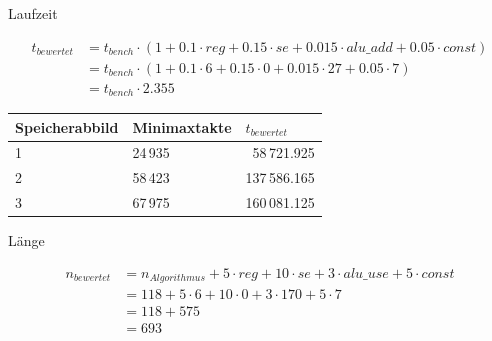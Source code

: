 \documentclass{beamer}
\begin{document}
\begin{frame}{Laufzeit}

{\footnotesize\begin{align*}
    t_{bewertet} &= t_{bench} \cdot (1 + 0.1 \cdot reg + 0.15 \cdot se + 0.015 \cdot alu\_add + 0.05 \cdot const) \\
                 &= t_{bench} \cdot (1 + 0.1 \cdot 6 + 0.15 \cdot 0 + 0.015 \cdot 27 + 0.05 \cdot 7) \\
                 &= t_{bench} \cdot 2.355
\end{align*}}

\begin{center}
    \begin{tabular}{|l|l|r|}
        \hline
        Speicherabbild & Minimaxtakte & \multicolumn{1}{l|}{$t_{bewertet}$} \\
        \hline
        \hline
        1 & 24\,935 & 58\,721.925 \\
        \hline
        2 & 58\,423 & 137\,586.165 \\
        \hline
        3 & 67\,975 & 160\,081.125 \\
        \hline
    \end{tabular}
\end{center}

\end{frame}



\begin{frame}{Länge}

{\footnotesize\begin{align*}
    n_{bewertet} &= n_{Algorithmus} + 5 \cdot reg + 10 \cdot se + 3 \cdot alu\_use + 5 \cdot const \\
                 &= 118 + 5 \cdot 6 + 10 \cdot 0 + 3 \cdot 170 + 5 \cdot 7 \\
                 &= 118 + 575 \\
                 &= 693
\end{align*}}

\end{frame}
\end{document}
